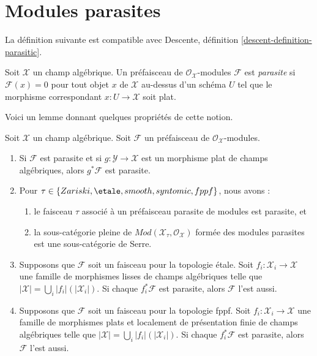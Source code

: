 \section{Modules parasites}
\label{section-parasitic}

\noindent
La définition suivante est compatible avec
Descente, définition \ref{descent-definition-parasitic}.

\begin{definition}
\label{definition-parasitic}
Soit $\mathcal{X}$ un champ algébrique.
Un préfaisceau de $\mathcal{O}_\mathcal{X}$-modules $\mathcal{F}$ est
{\it parasite} si $\mathcal{F}(x) = 0$ pour tout objet $x$
de $\mathcal{X}$ au-dessus d'un schéma $U$ tel que le morphisme
correspondant $x : U \to \mathcal{X}$ soit plat.
\end{definition}

\noindent
Voici un lemme donnant quelques propriétés de cette notion.

\begin{lemma}
\label{lemma-parasitic}
Soit $\mathcal{X}$ un champ algébrique. Soit $\mathcal{F}$
un préfaisceau de $\mathcal{O}_\mathcal{X}$-modules.
\begin{enumerate}
\item Si $\mathcal{F}$ est parasite et si
$g : \mathcal{Y} \to \mathcal{X}$ est un morphisme plat de champs algébriques,
alors $g^*\mathcal{F}$ est parasite.
\item Pour $\tau \in \{Zariski, \etale, smooth, syntomic, fppf\}$,
nous avons :
\begin{enumerate}
\item le faisceau $\tau$ associé à un préfaisceau parasite de modules est
parasite, et
\item la sous-catégorie pleine de
$\textit{Mod}(\mathcal{X}_\tau, \mathcal{O}_\mathcal{X})$
formée des modules parasites est une sous-catégorie de Serre.
\end{enumerate}
\item Supposons que $\mathcal{F}$ soit un faisceau pour la topologie étale.
Soit $f_i : \mathcal{X}_i \to \mathcal{X}$ une famille de
morphismes lisses de champs algébriques telle que
$|\mathcal{X}| = \bigcup_i |f_i|(|\mathcal{X}_i|)$. Si chaque
$f_i^*\mathcal{F}$ est parasite, alors $\mathcal{F}$ l'est aussi.
\item Supposons que $\mathcal{F}$ soit un faisceau pour la topologie fppf.
Soit $f_i : \mathcal{X}_i \to \mathcal{X}$ une famille de
morphismes plats et localement de présentation finie de champs algébriques telle que
$|\mathcal{X}| = \bigcup_i |f_i|(|\mathcal{X}_i|)$. Si chaque
$f_i^*\mathcal{F}$ est parasite, alors $\mathcal{F}$ l'est aussi.
\end{enumerate}
\end{lemma}

